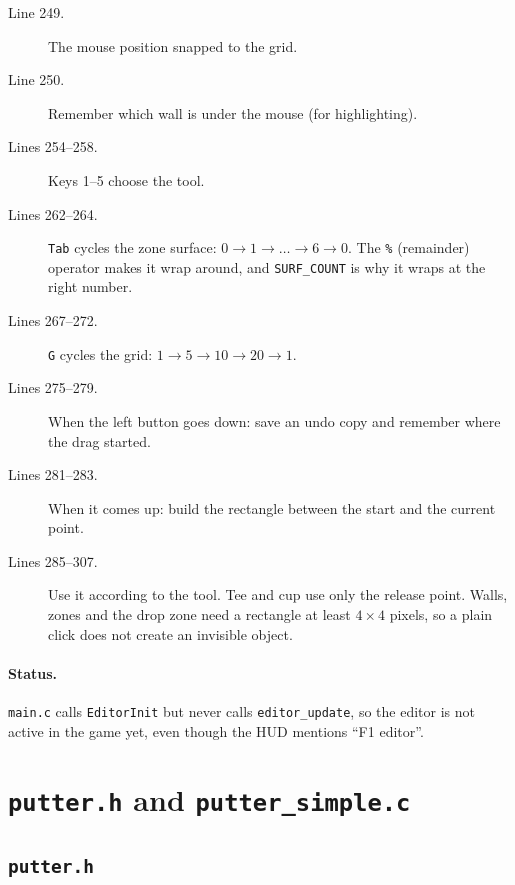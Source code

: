 \documentclass[11pt,a4paper]{article}
\newcommand{\code}[3]{}
\begin{document}
\begin{description}
  \item[Line 249.] The mouse position snapped to the grid.
  \item[Line 250.] Remember which wall is under the mouse (for highlighting).
  \item[Lines 254--258.] Keys 1--5 choose the tool.
  \item[Lines 262--264.] \texttt{Tab} cycles the zone surface: $0 \to 1 \to \dots \to 6 \to 0$. The \texttt{\%}
  (remainder) operator makes it wrap around, and \texttt{SURF\_COUNT} is why it wraps at the right number.
  \item[Lines 267--272.] \texttt{G} cycles the grid: $1 \to 5 \to 10 \to 20 \to 1$.
  \item[Lines 275--279.] When the left button goes down: save an undo copy and remember where the drag started.
  \item[Lines 281--283.] When it comes up: build the rectangle between the start and the current point.
  \item[Lines 285--307.] Use it according to the tool. Tee and cup use only the release point. Walls, zones and the
  drop zone need a rectangle at least $4\times4$ pixels, so a plain click does not create an invisible object.
\end{description}

\paragraph{Status.} \texttt{main.c} calls \texttt{EditorInit} but never calls \texttt{editor\_update}, so the
editor is not active in the game yet, even though the HUD mentions ``F1 editor''.

\section{\texttt{putter.h} and \texttt{putter\_simple.c}}

\subsection{\texttt{putter.h}}

\code{putter.h}{1}{41}
\end{document}
